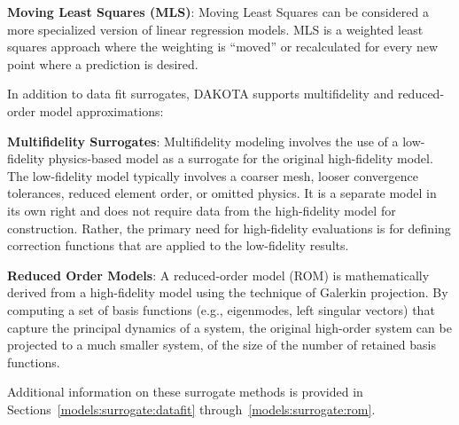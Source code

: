 \textbf{Moving Least Squares (MLS)}: Moving Least Squares can be 
considered a more specialized version of linear regression models.
MLS is a weighted least squares approach where the weighting is 
``moved'' or recalculated for every new point where 
a prediction is desired.~\cite{Nea04} 


In addition to data fit surrogates, DAKOTA supports multifidelity 
and reduced-order model approximations:

\textbf{Multifidelity Surrogates}: Multifidelity modeling involves the
use of a low-fidelity physics-based model as a surrogate for the
original high-fidelity model.  The low-fidelity model typically
involves a coarser mesh, looser convergence tolerances, reduced
element order, or omitted physics.  It is a separate model in its own
right and does not require data from the high-fidelity model for
construction.  Rather, the primary need for high-fidelity evaluations
is for defining correction functions that are applied to the
low-fidelity results.

\textbf{Reduced Order Models}: A reduced-order model (ROM) is
mathematically derived from a high-fidelity model using the technique
of Galerkin projection.  By computing a set of basis functions (e.g.,
eigenmodes, left singular vectors) that capture the principal dynamics
of a system, the original high-order system can be projected to a much
smaller system, of the size of the number of retained basis functions.

Additional information on these surrogate methods is provided in
Sections~\ref{models:surrogate:datafit} through~\ref{models:surrogate:rom}.

